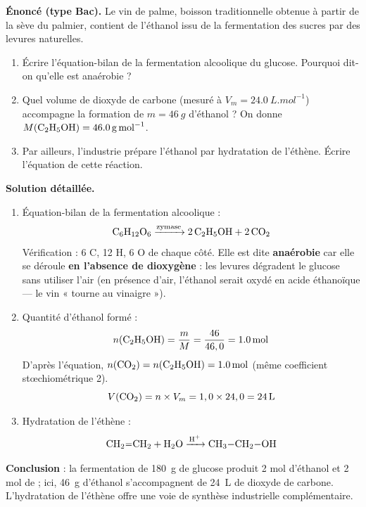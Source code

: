 \documentclass[11pt]{article}
\begin{document}
\begin{exoresolu}
\textbf{Énoncé (type Bac).} Le vin de palme, boisson traditionnelle obtenue à partir de la sève du palmier, contient de l'éthanol issu de la fermentation des sucres par des levures naturelles.
\begin{enumerate}
\item Écrire l'équation-bilan de la fermentation alcoolique du glucose. Pourquoi dit-on qu'elle est anaérobie ?
\item Quel volume de dioxyde de carbone (mesuré à $V_m = \SI{24,0}{L.mol^{-1}}$) accompagne la formation de $m = \SI{46}{g}$ d'éthanol ? On donne $M(\ce{C2H5OH}) = \SI{46,0}{g.mol^{-1}}$.
\item Par ailleurs, l'industrie prépare l'éthanol par hydratation de l'éthène. Écrire l'équation de cette réaction.
\end{enumerate}
\tcblower
\textbf{Solution détaillée.}
\begin{enumerate}
\item Équation-bilan de la fermentation alcoolique :
\[ \ce{C6H12O6 ->[zymase] 2 C2H5OH + 2 CO2} \]
Vérification : 6 C, 12 H, 6 O de chaque côté. Elle est dite \textbf{anaérobie} car elle se déroule \textbf{en l'absence de dioxygène} : les levures dégradent le glucose sans utiliser l'air (en présence d'air, l'éthanol serait oxydé en acide éthanoïque — le vin « tourne au vinaigre »).
\item Quantité d'éthanol formé :
\[ n(\ce{C2H5OH}) = \frac{m}{M} = \frac{46}{46,0} = \SI{1,0}{mol} \]
D'après l'équation, $n(\ce{CO2}) = n(\ce{C2H5OH}) = \SI{1,0}{mol}$ (même coefficient stœchiométrique 2).
\[ V(\ce{CO2}) = n \times V_m = 1,0 \times 24,0 = \SI{24}{L} \]
\item Hydratation de l'éthène :
\[ \ce{CH2=CH2 + H2O ->[H^+] CH3-CH2-OH} \]
\end{enumerate}
\textbf{Conclusion} : la fermentation de \SI{180}{g} de glucose produit 2 mol d'éthanol et 2 mol de  ; ici, \SI{46}{g} d'éthanol s'accompagnent de \SI{24}{L} de dioxyde de carbone. L'hydratation de l'éthène offre une voie de synthèse industrielle complémentaire.
\end{exoresolu}
\end{document}
